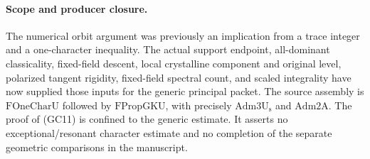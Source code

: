 \paragraph{Scope and producer closure.}
The numerical orbit argument was previously an
implication from a trace integer and a one-character
inequality.
The actual support endpoint, all-dominant
classicality, fixed-field descent, local crystalline
component and original level, polarized tangent
rigidity, fixed-field spectral count, and scaled
integrality have now supplied those inputs for
the generic principal packet.
The source assembly is
\(\mathrm{FOneCharU}\) followed by
\(\mathrm{FPropGKU}\), with precisely
\(\mathrm{Adm3U_s}\) and \(\mathrm{Adm2A}\).
The proof of (GC11) is confined to the generic
estimate. It asserts no exceptional/resonant
character estimate and no completion of the
separate geometric comparisons in the manuscript.

